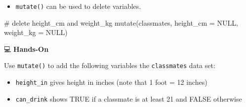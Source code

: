 \documentclass[
  letterpaper,
  DIV=11,
  numbers=noendperiod]{scrreprt}
\newenvironment{Shaded}{\begin{snugshade}}{\end{snugshade}}
\newcommand{\AttributeTok}[1]{\textcolor[rgb]{0.40,0.45,0.13}{#1}}
\newcommand{\CommentTok}[1]{\textcolor[rgb]{0.37,0.37,0.37}{#1}}
\newcommand{\ConstantTok}[1]{\textcolor[rgb]{0.56,0.35,0.01}{#1}}
\newcommand{\FunctionTok}[1]{\textcolor[rgb]{0.28,0.35,0.67}{#1}}
\newcommand{\NormalTok}[1]{\textcolor[rgb]{0.00,0.23,0.31}{#1}}
\providecommand{\tightlist}{%
  \setlength{\itemsep}{0pt}\setlength{\parskip}{0pt}}\usepackage{longtable,booktabs,array}
\begin{document}
\begin{itemize}
\tightlist
\item
  \texttt{mutate()} can be used to delete variables.
\end{itemize}

\begin{Shaded}
\begin{Highlighting}[]
\CommentTok{\# delete height\_cm and weight\_kg}
\FunctionTok{mutate}\NormalTok{(classmates, }\AttributeTok{height\_cm =} \ConstantTok{NULL}\NormalTok{, }\AttributeTok{weight\_kg =} \ConstantTok{NULL}\NormalTok{)}
\end{Highlighting}
\end{Shaded}

💻 \textbf{Hands-On}

Use \texttt{mutate()} to add the following variables the
\texttt{classmates} data set:

\begin{itemize}
\item
  \texttt{height\_in} gives height in inches (note that 1 foot = 12
  inches)
\item
  \texttt{can\_drink} shows TRUE if a classmate is at least 21 and FALSE
  otherwise
\end{itemize}
\end{document}
